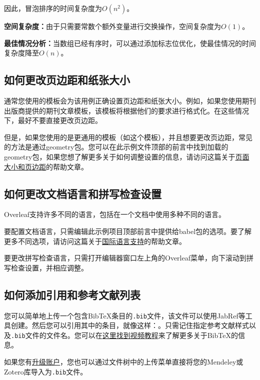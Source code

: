 \documentclass{article}
\begin{document}
因此，冒泡排序的时间复杂度为$O(n^2)$。

\textbf{空间复杂度：}由于只需要常数个额外变量进行交换操作，空间复杂度为$O(1)$。

\textbf{最佳情况分析：}当数组已经有序时，可以通过添加标志位优化，使最佳情况的时间复杂度降至$O(n)$。


\subsection{如何更改页边距和纸张大小}

通常您使用的模板会为该用例正确设置页边距和纸张大小。例如，如果您使用期刊出版商提供的期刊文章模板，该模板将根据他们的要求进行格式化。在这些情况下，最好不要直接更改页边距。

但是，如果您使用的是更通用的模板（如这个模板），并且想要更改页边距，常见的方法是通过geometry包。您可以在此示例文件顶部的前言中找到加载的geometry包，如果您想了解更多关于如何调整设置的信息，请访问这篇关于\href{https://www.overleaf.com/learn/latex/page_size_and_margins}{页面大小和页边距}的帮助文章。

\subsection{如何更改文档语言和拼写检查设置}

Overleaf支持许多不同的语言，包括在一个文档中使用多种不同的语言。

要配置文档语言，只需编辑此示例项目顶部前言中提供给babel包的选项。要了解更多不同选项，请访问这篇关于\href{https://www.overleaf.com/learn/latex/International_language_support}{国际语言支持}的帮助文章。

要更改拼写检查语言，只需打开编辑器窗口左上角的Overleaf菜单，向下滚动到拼写检查设置，并相应调整。

\subsection{如何添加引用和参考文献列表}

您可以简单地上传一个包含BibTeX条目的\verb|.bib|文件，该文件可以使用JabRef等工具创建。然后您可以引用其中的条目，就像这样：\cite{greenwade93}。只需记住指定参考文献样式以及\verb|.bib|文件的文件名。您可以在\href{https://www.overleaf.com/help/97-how-to-include-a-bibliography-using-bibtex}{这里找到视频教程}来了解更多关于BibTeX的信息。

如果您有\href{https://www.overleaf.com/user/subscription/plans}{升级账户}，您也可以通过文件树中的上传菜单直接将您的Mendeley或Zotero库导入为\verb|.bib|文件。
\end{document}
